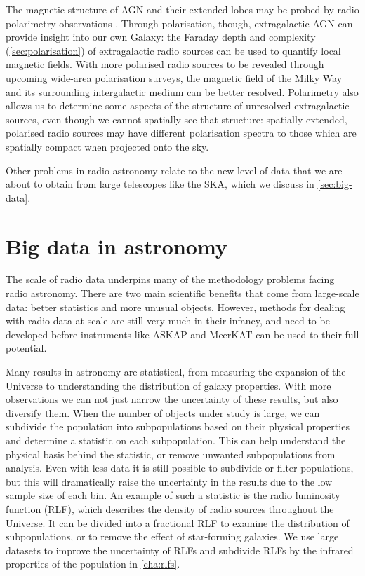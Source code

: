     The magnetic structure of AGN and their extended lobes may be probed by radio polarimetry observations \citep{anderson_broadband_2015,grant11polarised}. Through polarisation, though, extragalactic AGN can provide insight into our own Galaxy: the Faraday depth and complexity (\autoref{sec:polarisation}) of extragalactic radio sources can be used to quantify local magnetic fields. With more polarised radio sources to be revealed through upcoming wide-area polarisation surveys, the magnetic field of the Milky Way and its surrounding intergalactic medium can be better resolved. Polarimetry also allows us to determine some aspects of the structure of unresolved extragalactic sources, even though we cannot spatially see that structure: spatially extended, polarised radio sources may have different polarisation spectra to those which are spatially compact when projected onto the sky.

    Other problems in radio astronomy relate to the new level of data that we are about to obtain from large telescopes like the SKA, which we discuss in \autoref{sec:big-data}.

\section{Big data in astronomy}
\label{sec:big-data}

    The scale of radio data underpins many of the methodology problems facing radio astronomy. There are two main scientific benefits that come from large-scale data: better statistics and more unusual objects. However, methods for dealing with radio data at scale are still very much in their infancy, and need to be developed before instruments like ASKAP and MeerKAT can be used to their full potential.

    Many results in astronomy are statistical, from measuring the expansion of the Universe to understanding the distribution of galaxy properties. With more observations we can not just narrow the uncertainty of these results, but also diversify them. When the number of objects under study is large, we can subdivide the population into subpopulations based on their physical properties and determine a statistic on each subpopulation. This can help understand the physical basis behind the statistic, or 
    remove unwanted subpopulations from analysis. Even with less data it is still possible to subdivide or filter populations, but this will dramatically raise the uncertainty in the results due to the low sample size of each bin. An example of such a statistic is the radio luminosity function (RLF), which describes the density of radio sources throughout the Universe. It can be divided into a fractional RLF to examine the distribution of subpopulations, or to remove the effect of star-forming galaxies. We use large datasets to improve the uncertainty of RLFs and subdivide RLFs by the infrared properties of the population in \autoref{cha:rlfs}.

